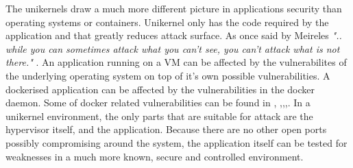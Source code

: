 The unikernels draw a much more different picture in applications security than operating systems or containers. Unikernel only has the code required by the application and that greatly reduces attack surface. As once said by Meireles  \textit{".. while you can sometimes attack what you can't see, you can't attack what is not there."} \cite{mailing-list}. An application running on a VM can be affected by the vulnerabilites of the underlying operating system on top of it's own possible vulnerabilities. A dockerised application can be affected by the vulnerabilities in the docker daemon. Some of docker related vulnerabilities can be found in \cite{CVE-2019-14271-details}, \cite{CVE-2018-9862-details},\cite{CVE-2018-8115-details},\cite{CVE-2018-11757-details},\cite{CVE-2019-5736-details}. In a unikernel environment, the only parts that are suitable for attack are the hypervisor itself, and the application. Because there are no other open ports possibly compromising around the system, the application itself can be tested for weaknesses in a much more known, secure and controlled environment.

